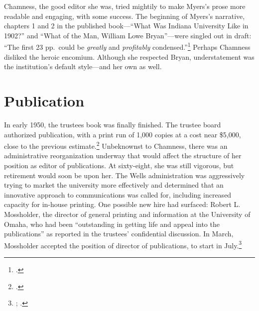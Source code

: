 \documentclass[
  american,
  letterpaper,
]{scrreprt}
\begin{document}
Chamness, the good editor she was, tried mightily to make Myers's prose
more readable and engaging, with some success. The beginning of Myers's
narrative, chapters 1 and 2 in the published book---``What Was Indiana
University Like in 1902?'' and ``What of the Man, William Lowe
Bryan''---were singled out in draft: ``The first 23 pp.~could be
\emph{greatly} and \emph{profitably} condensed.''\footnote{.}
Perhaps Chamness disliked the heroic encomium. Although she respected
Bryan, understatement was the institution's default style---and her own
as well.

\section{Publication}\label{publication}

In early 1950, the trustees book was finally finished. The trustee board
authorized publication, with a print run of 1,000 copies at a cost near
\$5,000, close to the previous estimate.\footnote{.}
Unbeknownst to Chamness, there was an administrative reorganization
underway that would affect the structure of her position as editor of
publications. At sixty-eight, she was still vigorous, but retirement
would soon be upon her. The Wells administration was aggressively trying
to market the university more effectively and determined that an
innovative approach to communications was called for, including
increased capacity for in-house printing. One possible new hire had
surfaced: Robert L. Mossholder, the director of general printing and
information at the University of Omaha, who had been ``outstanding in
getting life and appeal into the publications'' as reported in the
trustees' confidential discussion. In March, Mossholder accepted the
position of director of publications, to start in July.\footnote{;
  .}
\end{document}
